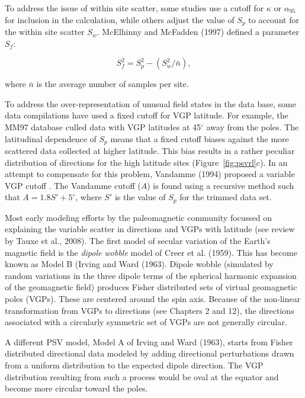 To address the issue of within site scatter,   some studies use a cutoff for $\kappa$ or $\alpha_{95}$ for inclusion in the calculation, while others adjust the value of $S_p$ to account for the within site scatter $S_w$.   
McElhinny and McFadden (1997) \nocite{mcelhinny97} defined a parameter $S_f$:

\begin{equation}
S_f^2 = S_p^2 - (S_w^2/\bar n),
\label{eq:Sf}
\end{equation}

\noindent where  $\bar n$ is the average number of samples per site.   

To address the over-representation of unusual field states in the data base, 
some data compilations have used a fixed cutoff for VGP latitude.  For example, the MM97 database culled data with VGP latitudes at 45$^{\circ}$  away from the poles.    The latitudinal dependence of $S_p$ means that a fixed cutoff  biases against the more scattered data collected at higher latitude.  This bias results in a rather peculiar distribution of directions for the high latitude sites (Figure~\ref{fig:psvrl}c).    In an attempt to compensate for this problem,   Vandamme (1994) proposed a variable VGP cutoff \nocite{vandamme94}.  
  The Vandamme cutoff ($A$) is found using a recursive method such that $A = 1.8 S' +5^{\circ}$, where $S'$ is the value of $S_p$ for the trimmed data set.  



Most early modeling efforts by the paleomagnetic community focussed on explaining the variable scatter in directions and VGPs with latitude (see review by 
Tauxe et al., 2008).  \nocite{tauxe08}
The first model of 
secular variation of the Earth's magnetic field is the 
{\it dipole wobble}  model of 
Creer et al. (1959).  \nocite{creer59}This has become known as  Model  B 
 (Irving and Ward (1963).  \nocite{irving63}   Dipole wobble (simulated by random variations in the three dipole terms of the spherical harmonic expansion of the geomagnetic field)  produces  \nocite{fisher53} Fisher distributed sets of virtual geomagnetic poles (VGPs).  These are centered around the spin axis.  Because of the non-linear transformation from VGPs to directions (see Chapters 2 and 12), the directions associated with a circularly symmetric set of VGPs  are not generally circular.  

A different PSV model, Model A of 
Irving and Ward (1963),  starts from Fisher distributed directional data  modeled by  adding directional perturbations drawn from a uniform distribution  to the expected dipole direction.   The VGP distribution resulting from such a process would be oval at the equator and become more circular toward the poles.   

